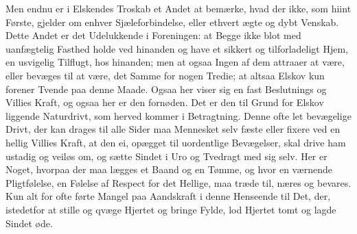 \documentclass[12pt,a4paper]{book}
\newcommand{\apage}[1]{\marginnote{\footnotesize\textit{[#1]}}}
\begin{document}
Men endnu er i Elskendes Troskab et Andet at bemærke, hvad der ikke, som
hiint Første, gjelder om enhver Sjæleforbindelse, eller ethvert ægte og
dybt Venskab. Dette Andet er det Udelukkende i Foreningen: at Begge ikke
blot med uanfægtelig Fasthed holde ved hinanden og have et sikkert og
tilforladeligt Hjem, en usvigelig Tilflugt, hos hinanden; men at ogsaa
Ingen af dem attraaer at være, eller bevæges til at være, det Samme for
nogen Tredie; at altsaa Elskov kun forener Tvende paa denne Maade.
Ogsaa her viser sig en fast Beslutnings og Villies Kraft, og ogsaa her
er den fornøden. Det er den til Grund for Elskov liggende Naturdrivt, som
herved kommer i Betragtning. Denne ofte let bevægelige Drivt, der kan
drages til alle Sider maa Mennesket selv fæste eller fixere ved en
hellig Villies Kraft, at den ei, opægget til uordentlige Bevægelser,
skal drive ham ustadig og veiløs om, og sætte \apage{65} Sindet i Uro og Tvedragt
med sig selv. Her er Noget, hvorpaa der maa lægges et Baand og en Tømme,
og hvor en værnende Pligtfølelse, en Følelse af Respect for det Hellige,
maa træde til, næres og bevares. Kun alt for ofte førte Mangel paa
Aandskraft i denne Henseende til Det, der, istedetfor at stille og qvæge
Hjertet og bringe Fylde, lod Hjertet tomt og lagde Sindet øde.
\end{document}
